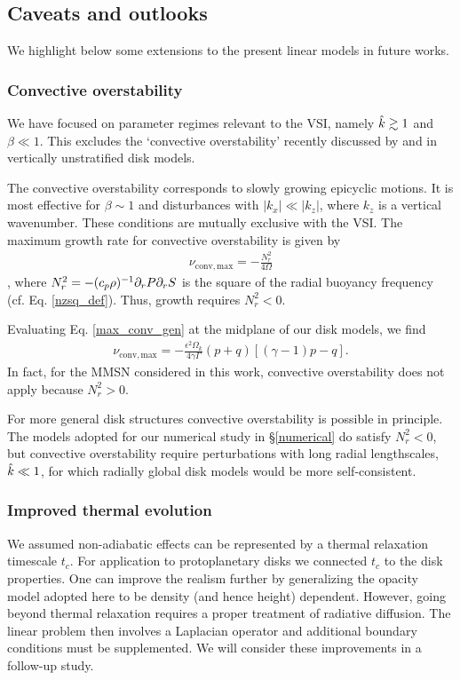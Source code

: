 \subsection{Caveats and outlooks} 
We highlight below some extensions to the present  
linear models in future works.  

\subsubsection{Convective overstability}
We have focused on parameter regimes relevant to the VSI,
namely $\hat{k}\gtrsim 1$ and $\beta\ll 1$. This excludes the
`convective overstability' recently discussed by \cite{klahr14} and
\cite{lyra14} in vertically unstratified disk models. 

The convective overstability corresponds to slowly growing epicyclic motions.
It is most effective for $\beta\sim 1$ and disturbances with $|k_x|\ll |k_z|$, where
$k_z$ is a vertical wavenumber. These conditions are mutually exclusive with the VSI. 
The maximum growth rate for convective overstability is given by 
\begin{align}
  \nu_\mathrm{conv,max} = -\frac{N^2_r}{4\Omega}\label{max_conv_gen}
\end{align}
\citep{lyra14}, where $N_r^2 = -(c_p\rho)^{-1}\partial_rP\partial_rS$ is the
square of the radial buoyancy frequency
(cf. Eq. \ref{nzsq_def}). Thus, growth requires $N_r^2<0$.  

Evaluating Eq. \ref{max_conv_gen} at the midplane of our disk models,
we find  
\begin{align}
  \nu_\mathrm{conv,max} =
  -\frac{\epsilon^2\Omega_k}{4\gamma\Gamma}\left(p+q\right)
  \left[\left(\gamma-1\right)p-q\right]. \label{max_conv}
\end{align}
In fact, for the MMSN considered in this work, convective
overstability does not apply because 
$N_r^2>0$.   

For more general disk structures convective overstability is
possible in principle. The models adopted for our numerical study in
\S\ref{numerical} do satisfy $N_r^2<0$, but convective overstability
require perturbations with long radial lengthscales,
$\hat{k}\ll 1$, for which radially global disk models would be more 
self-consistent. 

\subsubsection{Improved thermal evolution} 
We assumed non-adiabatic effects
can be represented by a thermal relaxation timescale $t_c$. For 
application to protoplanetary disks we connected $t_c$ to the disk
properties. One can improve the realism further by generalizing the 
opacity model adopted here to be density (and hence height) dependent. 
However, going beyond thermal relaxation requires a
proper treatment of radiative diffusion. The linear problem then
involves a Laplacian operator and additional boundary
conditions must be supplemented. We will consider these improvements in a
follow-up study. %
 
